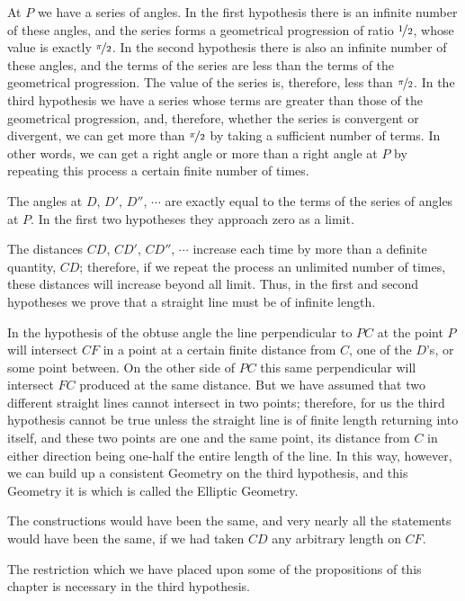 At $P$ we have a series of angles. In the first hypothesis there is
an infinite number of these angles, and the series forms a
geometrical progression of ratio $\nicefrac{1}{2}$, whose value is
exactly $\nicefrac{\pi}{2}$. In the second hypothesis there is also
an infinite number of these angles, and the terms of the series are
less than the terms of the geometrical progression. The value of the
series is, therefore, less than $\nicefrac{\pi}{2}$. In the third
hypothesis we have a series whose terms are greater than those of
the geometrical progression, and, therefore, whether the series is
convergent or divergent, we can get more than $\nicefrac{\pi}{2}$ by
taking a sufficient number of terms. In other words, we can get a
right angle or more than a right angle at $P$ by repeating this
process a certain finite number of times.

The angles at $D$, $D'$, $D''$, $\cdots$ are exactly equal to the
terms of the series of angles at $P$. In the first two hypotheses
they approach zero as a limit.

The distances $CD$, $CD'$, $CD''$, $\cdots$ increase each time by
more than a definite quantity, $CD$; therefore, if we repeat the
process an unlimited number of times, these distances will increase
beyond all limit. Thus, in the first and second hypotheses we prove
that a straight line must be of infinite length.

In the hypothesis of the obtuse angle the line perpendicular to $PC$
at the point $P$ will intersect $CF$ in a point at a certain finite
distance from $C$, one of the $D$'s, or some point between. On the
other side of $PC$ this same perpendicular will intersect $FC$
produced at the same distance. But we have assumed that two
different straight lines cannot intersect in two points; therefore,
for us the third hypothesis cannot be true unless the straight line
is of finite length returning into itself, and these two points are
one and the same point, its distance from $C$ in either direction
being one-half the entire length of the line. In this way, however,
we can build up a consistent Geometry on the third hypothesis, and
this Geometry it is which is called the Elliptic Geometry.

The constructions would have been the same, and very nearly all the
statements would have been the same, if we had taken $CD$ any
arbitrary length on $CF$.

The restriction which we have placed upon some of the propositions
of this chapter is necessary in the third hypothesis.


